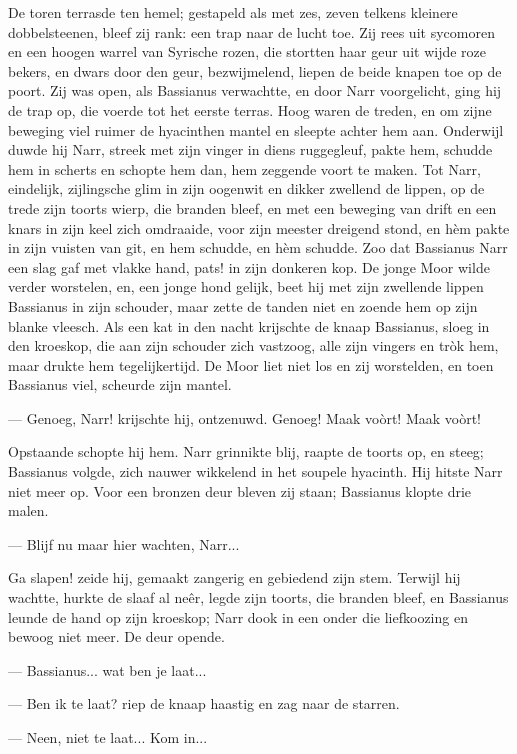 \documentclass[a4paper, 12pt, oneside, dutch]{article}
\begin{document}
De toren terrasde ten hemel; gestapeld als met zes, zeven telkens kleinere dobbelsteenen, bleef zij rank: een trap naar de lucht toe. Zij rees uit sycomoren en een hoogen warrel van Syrische rozen, die stortten haar geur uit wijde roze bekers, en dwars door den geur, bezwijmelend, liepen de beide knapen toe op de poort. Zij was open, als Bassianus verwachtte, en door Narr voorgelicht, ging hij de trap op, die voerde tot het eerste terras. Hoog waren de treden, en om zijne beweging viel ruimer de hyacinthen mantel en sleepte achter hem aan. Onderwijl duwde hij Narr, streek met zijn vinger in diens ruggegleuf, pakte hem, schudde hem in scherts en schopte hem dan, hem zeggende voort te maken. Tot Narr, eindelijk, zijlingsche glim in zijn oogenwit en dikker zwellend de lippen, op de trede zijn toorts wierp, die branden bleef, en met een beweging van drift en een knars in zijn keel zich omdraaide, voor zijn meester dreigend stond, en hèm pakte in zijn vuisten van git, en hem schudde, en hèm schudde. Zoo dat Bassianus Narr een slag gaf met vlakke hand, pats! in zijn donkeren kop. De jonge Moor wilde verder worstelen, en, een jonge hond gelijk, beet hij met zijn zwellende lippen Bassianus in zijn schouder, maar zette de tanden niet en zoende hem op zijn blanke vleesch. Als een kat in den nacht krijschte de knaap Bassianus, sloeg in den kroeskop, die aan zijn schouder zich vastzoog, alle zijn vingers en tròk hem, maar drukte hem tegelijkertijd. De Moor liet niet los en zij worstelden, en toen Bassianus viel, scheurde zijn mantel.

--- Genoeg, Narr! krijschte hij, ontzenuwd. Genoeg! Maak voòrt! Maak voòrt!

Opstaande schopte hij hem. Narr grinnikte blij, raapte de toorts op, en steeg; Bassianus volgde, zich nauwer wikkelend in het soupele hyacinth. Hij hitste Narr niet meer op. Voor een bronzen deur bleven zij staan; Bassianus klopte drie malen.

--- Blijf nu maar hier wachten, Narr...

Ga slapen! zeide hij, gemaakt zangerig en gebiedend zijn stem. Terwijl hij wachtte, hurkte de slaaf al neêr, legde zijn toorts, die branden bleef, en Bassianus leunde de hand op zijn kroeskop; Narr dook in een onder die liefkoozing en bewoog niet meer. De deur opende.

--- Bassianus... wat ben je laat...

--- Ben ik te laat? riep de knaap haastig en zag naar de starren.

--- Neen, niet te laat... Kom in...
\end{document}
